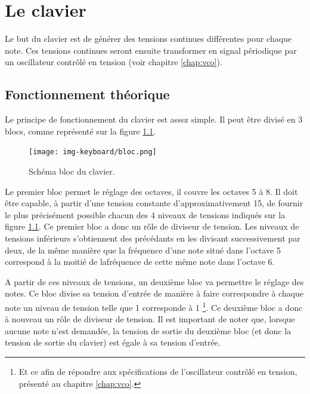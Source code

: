 \chapter{Le clavier}
Le but du clavier est de générer des tensions continues
différentes pour chaque note. Ces tensions continues
seront ensuite transformer en signal périodique par un
oscillateur contrôlé en tension (voir chapitre \ref{chap:vco}).

\section{Fonctionnement théorique}
Le principe de fonctionnement du clavier est assez simple.
Il peut être divisé en 3 blocs, comme représenté sur la
figure \ref{fig:keyboard-bloc}.

\begin{figure}[ht]
	\centering
	\texttt{[image: img-keyboard/bloc.png]}
	\caption{Schéma bloc du clavier.}
	\label{fig:keyboard-bloc}
\end{figure}

Le premier bloc permet le réglage des octaves, il couvre
les octaves 5 à 8. Il doit
être capable, à partir d'une tension constante d'approximativement
\unit{15}{\volt}, de fournir le plus précisément possible chacun 
des 4 niveaux de tensions indiqués sur la figure \ref{fig:keyboard-bloc}.
Ce premier bloc a donc un rôle de diviseur de tension.
Les niveaux de tensions inférieurs s'obtiennent des précédants en
les divisant successivement par deux, de la même manière
que la fréquence d'une note situé dans l'octave 5 correspond
à la moitié de lafréquence de cette même note dans l'octave 6.

A partir de ces niveaux de tensions, un deuxième bloc va
permettre le réglage des notes. Ce bloc divise sa tension d'entrée
de manière à faire correspondre à chaque note un niveau de tension
telle que \unit{1}{\milli\volt} corresponde à \unit{1}{\hertz}
\footnote{Et ce afin de répondre aux spécifications de l'oscillateur
contrôlé en tension, présenté au chapitre \ref{chap:vco}.}. Ce deuxième
bloc a donc à nouveau un rôle de diviseur de tension. Il est important
de noter que, lorsque aucune note n'est demandée, la tension de sortie
du deuxième bloc (et donc la tension de sortie du clavier) est égale à
sa tension d'entrée.

